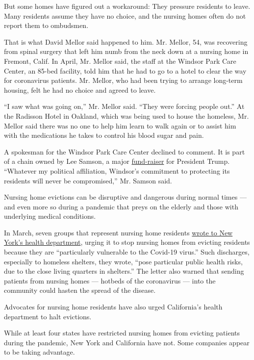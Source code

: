 But some homes have figured out a workaround: They pressure residents to
leave. Many residents assume they have no choice, and the nursing homes
often do not report them to ombudsmen.

That is what David Mellor said happened to him. Mr. Mellor, 54, was
recovering from spinal surgery that left him numb from the neck down at
a nursing home in Fremont, Calif. In April, Mr. Mellor said, the staff
at the Windsor Park Care Center, an 85-bed facility, told him that he
had to go to a hotel to clear the way for coronavirus patients. Mr.
Mellor, who had been trying to arrange long-term housing, felt he had no
choice and agreed to leave.

``I saw what was going on,'' Mr. Mellor said. ``They were forcing people
out.'' At the Radisson Hotel in Oakland, which was being used to house
the homeless, Mr. Mellor said there was no one to help him learn to walk
again or to assist him with the medications he takes to control his
blood sugar and pain.

A spokesman for the Windsor Park Care Center declined to comment. It is
part of a chain owned by Lee Samson, a major
\href{https://timesofsandiego.com/politics/2019/04/05/trump-raises-4-million-for-re-election-campaign-at-los-angeles-dinners/}{fund-raiser}
for President Trump. ``Whatever my political affiliation, Windsor's
commitment to protecting its residents will never be compromised,'' Mr.
Samson said.

Nursing home evictions can be disruptive and dangerous during normal
times --- and even more so during a pandemic that preys on the elderly
and those with underlying medical conditions.

In March, seven groups that represent nursing home residents
\href{https://www.yumpu.com/en/document/read/63189113/moratorium-on-nursing-home-discharge-letter}{wrote
to New York's health department}, urging it to stop nursing homes from
evicting residents because they are ``particularly vulnerable to the
Covid-19 virus.'' Such discharges, especially to homeless shelters, they
wrote, ``pose particular public health risks, due to the close living
quarters in shelters.'' The letter also warned that sending patients
from nursing homes --- hotbeds of the coronavirus --- into the community
could hasten the spread of the disease.

Advocates for nursing home residents have also urged California's health
department to halt evictions.

While at least four states have restricted nursing homes from evicting
patients during the pandemic, New York and California have not. Some
companies appear to be taking advantage.

